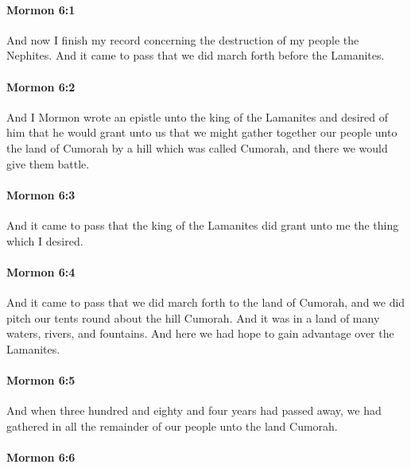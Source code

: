 		\paragraph{Mormon 6:1} %
			\label{MORMON-6-1}

			And now I finish my record
			concerning the destruction of my people the Nephites.
			And it came to pass that we did march forth before the Lamanites.

		\paragraph{Mormon 6:2} %
			\label{MORMON-6-2}

			And I Mormon wrote an epistle unto the king of the Lamanites
			and desired of him that he would grant unto us
			that we might gather together our people unto the land of Cumorah
			by a hill which was called Cumorah,
			and there we would give them battle.

		\paragraph{Mormon 6:3} %
			\label{MORMON-6-3}

			And it came to pass that
			the king of the Lamanites did grant unto me the thing which I desired.

		\paragraph{Mormon 6:4} %
			\label{MORMON-6-4}

			And it came to pass that we did march forth to the land of Cumorah,
			and we did pitch our tents round about the hill Cumorah.
			And it was in a land of many waters, rivers, and fountains.
			And here we had hope to gain advantage over the Lamanites.

		\paragraph{Mormon 6:5} %
			\label{MORMON-6-5}

			And when three hundred and eighty and four years had passed away,
			we had gathered in all the remainder of our people unto the land Cumorah.

		\paragraph{Mormon 6:6} %
			\label{MORMON-6-6}

